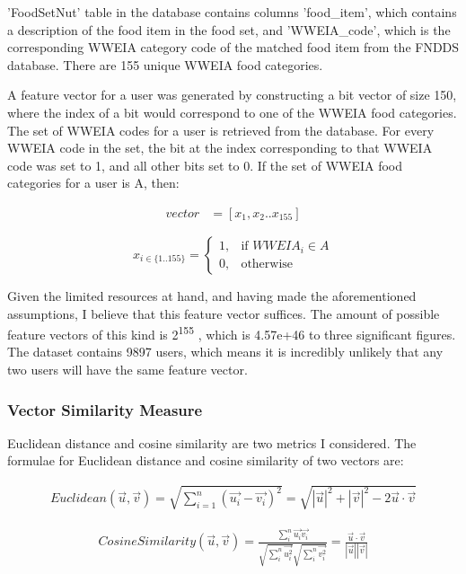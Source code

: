 \documentclass{article}
\begin{document}
\bigskip
\noindent 'FoodSetNut' table in the database contains columns 'food\_item', which contains a description of the food item in the food set, and 'WWEIA\_code', which is the corresponding WWEIA category code of the matched food item from the FNDDS database. There are 155 unique WWEIA food categories. 

\bigskip
\noindent A feature vector for a user was generated by constructing a bit vector of size 150, where the index of a bit would correspond to one of the WWEIA food categories. The set of WWEIA codes for a user is retrieved from the database. For every WWEIA code in the set, the bit at the index corresponding to that WWEIA code was set to 1, and all other bits set to 0. If the set of WWEIA food categories for a user is A, then: 

\begin{align*}
    vector &= [x_1,x_2..x_{155}]
\end{align*}

\[
    x_{i \in \{1..155\}} = 
\begin{cases}
    1,& \text{if } WWEIA_i \in A\\
    0,& \text{otherwise}
\end{cases}
\]

\bigskip
\noindent Given the limited resources at hand, and having made the aforementioned assumptions, I believe that this feature vector suffices. The amount of possible feature vectors of this kind is 2\textsuperscript{155} , which is 4.57e+46 to three significant figures. The dataset contains 9897 users, which means it is incredibly unlikely that any two users will have the same feature vector.

\subsubsection{Vector Similarity Measure}
Euclidean distance and cosine similarity are two metrics I considered. The formulae for Euclidean distance and cosine similarity of two vectors are:

\begin{align*}
    Euclidean(\vec{u},\vec{v}) = \sqrt{\sum_{i=1}^{n} ({\vec{u_{i}}-\vec{v_{i}}})^2} = \sqrt{|\vec{u}|^{2} + |\vec{v}|^{2} - 2\vec{u}\cdot\vec{v}}
\end{align*}

\begin{align*}
    Cosine Similarity (\vec{u},\vec{v}) = \frac{\sum_{i}^{n} \vec{u_{i}}\vec{v_{i}}}{ \sqrt{\sum_{i}^{n} \vec{u_{i}^{2}}} \sqrt{\sum_{i}^{n} \vec{v_{i}^{2}}}} = \frac{\vec{u}\cdot\vec{v}}{|\vec{u}||\vec{v}|}
\end{align*}
\end{document}
